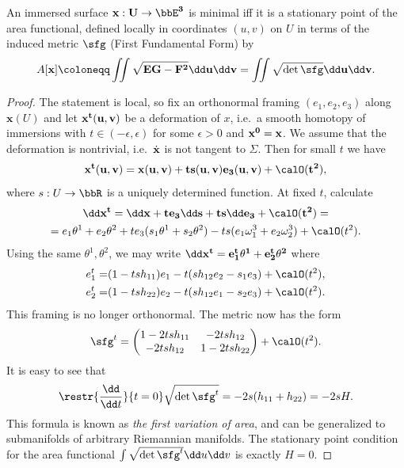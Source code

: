 \begin{prop}
    An immersed surface $\bf{x}:U\to \bbE^3$ is minimal iff it is a stationary point of the area functional, defined locally in coordinates $(u,v)$ on $U$ in terms of the induced metric $\sfg$ (First Fundamental Form) by
    \[A[\bf{x}]\coloneqq \iint \sqrt{EG-F^2}\dd u\dd v=\iint \sqrt{\det\sfg}\dd u\dd v.\]
\end{prop}
\begin{proof}
    The statement is local, so fix an orthonormal framing $(e_1,e_2,e_3)$ along $\bm{x}(U)$ and let $\bf{x}^t(u,v)$ be a deformation of $x$, i.e.~a smooth homotopy of immersions with $t\in (-\epsilon,\epsilon)$ for some $\epsilon>0$ and $\bf{x}^0=\bf{x}$. We assume that the deformation is nontrivial, i.e.\ $\dot{\bf{x}}$ is not tangent to $\Sigma$. Then for small $t$ we have 
    \[\bf{x}^t(u,v)=\bf{x}(u,v)+t s(u,v)e_3(u,v)+\calO(t^2),\]
    where $s:U\to \bbR$ is a uniquely determined function. At fixed $t$, calculate 
    \begin{multline}
        \dd \bf{x}^t=\dd\bf{x}+te_3\dd s+ts\dd e_3+\calO(t^2)=\\
        =e_1\theta^1+e_2\theta^2+te_3(s_1\theta^1+s_2\theta^2)-ts(e_1\omega_1^3+e_2\omega_2^3)+\calO(t^2).
    \end{multline}
    Using the same $\theta^1,\theta^2$, we may write $\dd\bf{x}^t=e_1^t\theta^1+e_2^t\theta^2$ where 
    \begin{align}
        e_1^t=& (1-tsh_{11})e_1-t(sh_{12}e_2-s_1e_3)+\calO(t^2),\\
        e_2^t=& (1-tsh_{22})e_2-t(sh_{12}e_1-s_2e_3)+\calO(t^2).
    \end{align}
    This framing is no longer orthonormal. The metric now has the form 
    \[\sfg^t=\begin{pmatrix}
        1-2tsh_{11} & -2tsh_{12}\\
        -2tsh_{12} & 1-2tsh_{22}
    \end{pmatrix}+\calO(t^2).\]
    It is easy to see that
    \[\restr{\frac{\dd}{\dd t}}{t=0}\sqrt{\det \sfg^t}=-2s(h_{11}+h_{22})=-2sH.\]
    This formula is known as \emph{the first variation of area}, and can be generalized to submanifolds of arbitrary Riemannian manifolds. The stationary point condition for the area functional $\int \sqrt{\det\sfg^t}\dd u\dd v$ is exactly $H=0$.
\end{proof}
